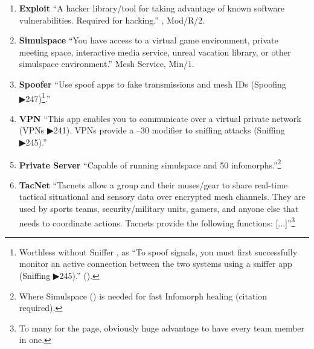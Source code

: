 \begin{enumerate}
    \item \textbf{\gls{Exploit}} “A hacker library/tool for taking advantage of known software vulnerabilities. Required for hacking.” \citep[pg. 326]{ep2e_1.1_2019} , Mod/R/2.

    \item \textbf{\gls{Simulspace}} “You have access to a virtual game environment, private meeting space, interactive media service, unreal vacation library, or other simulspace environment.” \citep[pg. 315]{ep2e_1.1_2019} Mesh Service, Min/1. %

    \item \textbf{\gls{Spoofer}} “Use spoof apps to fake transmissions and mesh IDs (Spoofing ▶247)\footnote{Worthless without Sniffer \citep[pg. 326]{ep2e_1.1_2019}, as “To spoof signals, you must first successfully monitor an active connection between the two systems using a sniffer app (Sniffing ▶245).” (\citep[pg. 247]{ep2e_1.1_2019}).}.” \citep[pg. 326]{ep2e_1.1_2019}

    \item \textbf{\gls{VPN}} “This app enables you to communicate over a virtual private network (VPNs ▶241). VPNs provide a –30 modifier to sniffing attacks (Sniffing ▶245).” \citep[pg. 326]{ep2e_1.1_2019}

    \item \textbf{\gls{Private Server}} “Capable of running simulspace and 50 infomorphs.”\footnote{Where Simulspace (\citep[pg. 315]{ep2e_1.1_2019}) is needed for fast Infomorph healing (citation required).} \citep[pg. 315]{ep2e_1.1_2019}

    \item \textbf{\gls{TacNet}} “Tacnets allow a group and their muses/gear to share real-time tactical situational and sensory data over encrypted mesh channels. They are used by sports teams, security/military units, gamers, and anyone else that needs to coordinate actions. Tacnets provide the following functions: [...]”\footnote{To many for the page, obviously huge advantage to have every team member in one.} \citep[pg. 327]{ep2e_1.1_2019}


\end{enumerate}
